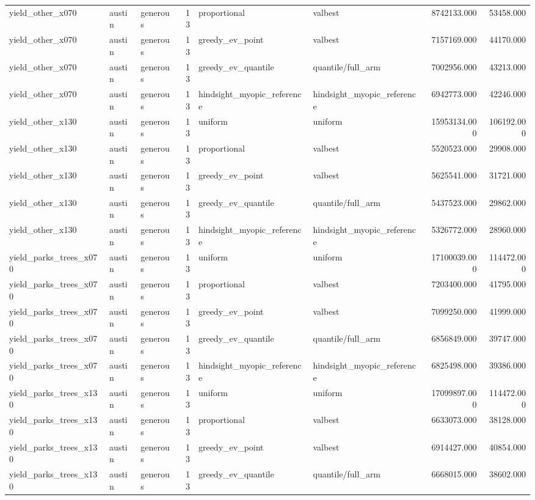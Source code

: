 \begin{tabular}{lllrllrr}
yield\_other\_x070 & austin & generous & 13 & proportional & valbest & 8742133.000 & 53458.000 \\
yield\_other\_x070 & austin & generous & 13 & greedy\_ev\_point & valbest & 7157169.000 & 44170.000 \\
yield\_other\_x070 & austin & generous & 13 & greedy\_ev\_quantile & quantile/full\_arm & 7002956.000 & 43213.000 \\
yield\_other\_x070 & austin & generous & 13 & hindsight\_myopic\_reference & hindsight\_myopic\_reference & 6942773.000 & 42246.000 \\
yield\_other\_x130 & austin & generous & 13 & uniform & uniform & 15953134.000 & 106192.000 \\
yield\_other\_x130 & austin & generous & 13 & proportional & valbest & 5520523.000 & 29908.000 \\
yield\_other\_x130 & austin & generous & 13 & greedy\_ev\_point & valbest & 5625541.000 & 31721.000 \\
yield\_other\_x130 & austin & generous & 13 & greedy\_ev\_quantile & quantile/full\_arm & 5437523.000 & 29862.000 \\
yield\_other\_x130 & austin & generous & 13 & hindsight\_myopic\_reference & hindsight\_myopic\_reference & 5326772.000 & 28960.000 \\
yield\_parks\_trees\_x070 & austin & generous & 13 & uniform & uniform & 17100039.000 & 114472.000 \\
yield\_parks\_trees\_x070 & austin & generous & 13 & proportional & valbest & 7203400.000 & 41795.000 \\
yield\_parks\_trees\_x070 & austin & generous & 13 & greedy\_ev\_point & valbest & 7099250.000 & 41999.000 \\
yield\_parks\_trees\_x070 & austin & generous & 13 & greedy\_ev\_quantile & quantile/full\_arm & 6856849.000 & 39747.000 \\
yield\_parks\_trees\_x070 & austin & generous & 13 & hindsight\_myopic\_reference & hindsight\_myopic\_reference & 6825498.000 & 39386.000 \\
yield\_parks\_trees\_x130 & austin & generous & 13 & uniform & uniform & 17099897.000 & 114472.000 \\
yield\_parks\_trees\_x130 & austin & generous & 13 & proportional & valbest & 6633073.000 & 38128.000 \\
yield\_parks\_trees\_x130 & austin & generous & 13 & greedy\_ev\_point & valbest & 6914427.000 & 40854.000 \\
yield\_parks\_trees\_x130 & austin & generous & 13 & greedy\_ev\_quantile & quantile/full\_arm & 6668015.000 & 38602.000 \\

\end{tabular}
